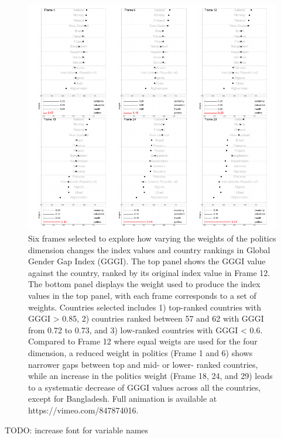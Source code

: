 \documentclass[
]{interact}
\begin{document}
\begin{figure}

{\centering \includegraphics{tidyindex_files/figure-pdf/fig-idx-tour-1.pdf}

}

\caption{\label{fig-idx-tour}Six frames selected to explore how varying
the weights of the politics dimension changes the index values and
country rankings in Global Gender Gap Index (GGGI). The top panel shows
the GGGI value against the country, ranked by its original index value
in Frame 12. The bottom panel displays the weight used to produce the
index values in the top panel, with each frame corresponds to a set of
weights. Countries selected includes 1) top-ranked countries with GGGI
\textgreater{} 0.85, 2) countries ranked between 57 and 62 with GGGI
from 0.72 to 0.73, and 3) low-ranked countries with GGGI \textless{}
0.6. Compared to Frame 12 where equal weigts are used for the four
dimension, a reduced weight in politics (Frame 1 and 6) shows narrower
gaps between top and mid- or lower- ranked countries, while an increase
in the politics weight (Frame 18, 24, and 29) leads to a systematic
decrease of GGGI values across all the countries, except for Bangladesh.
Full animation is available at https://vimeo.com/847874016.}

\end{figure}

TODO: increase font for variable names
\end{document}
